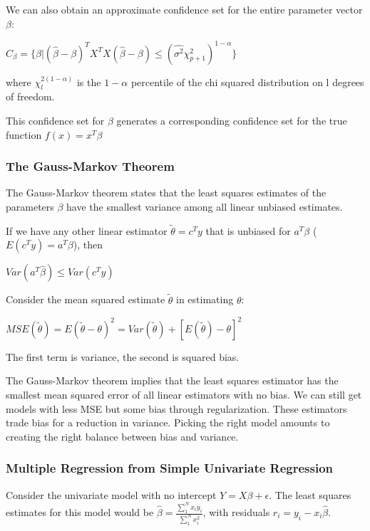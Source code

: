 \documentclass[11pt]{article}
\begin{document}
We can also obtain an approximate confidence set for the entire parameter vector \(\beta\): 

\(C_{\beta} = \{\beta | (\hat{\beta} - \beta)^T X^TX(\hat{\beta} - \beta) \leq (\hat{\sigma^2}\chi_{p + 1}^2)^{1 - \alpha}\}\)

where \(\chi_l^{2(1-\alpha)}\) is the \(1 - \alpha\) percentile of the chi squared distribution on l degrees of freedom. 

This confidence set for \(\beta\) generates a corresponding confidence set for the true function \(f(x) = x^T\beta\)

\subsubsection{The Gauss-Markov Theorem}
\label{sec:org7be48b4}

The Gauss-Markov theorem states that the least squares estimates of the parameters \(\beta\) have the smallest variance among all linear unbiased estimates.

If we have any other linear estimator \(\tilde{\theta} = c^Ty\) that is unbiased for \(a^T\beta\) (\(E(c^Ty) = a^T\beta\)), then 

\(Var(a^T\hat{\beta}) \leq Var(c^Ty)\)

Consider the mean squared estimate \(\tilde{\theta}\) in estimating \(\theta\):

\(MSE(\tilde{\theta}) = E(\tilde{\theta} -\theta)^2 = Var(\tilde{\theta}) + [E(\tilde{\theta}) - \theta]^2\)

The first term is variance, the second is squared bias. 

The Gauss-Markov theorem implies that the least squares estimator has the smallest mean squared error of all linear estimators with no bias. We can still get models with less MSE but some bias through regularization. These estimators trade bias for a reduction in variance. Picking the right model amounts to creating the right balance between bias and variance. 

\subsubsection{Multiple Regression from Simple Univariate Regression}
\label{sec:orgf8343cf}

Consider the univariate model with no intercept \(Y = X\beta + \epsilon\). The least squares estimates for this model would be \(\hat{\beta} = \frac{\sum_1^N x_i y_i}{\sum_1^N x_i^2}\), with residuals \(r_i = y_i - x_i \hat{\beta}\). 
\end{document}
